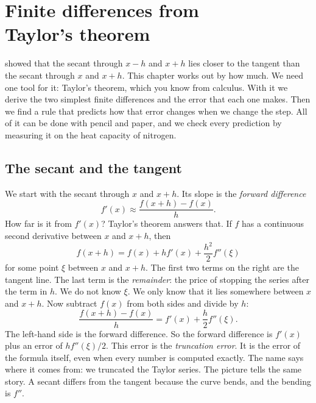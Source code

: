 \chapter[Finite differences from Taylor's theorem]{Finite differences from\\ Taylor's theorem}\label{ch:taylor}

 showed that the secant through $x - h$ and $x + h$ lies closer to the tangent than the secant
through $x$ and $x + h$. This chapter works out by how much. We need one tool for it: Taylor's theorem, which you
know from calculus. With it we derive the two simplest finite differences and the error that each one makes. Then we
find a rule that predicts how that error changes when we change the step. All of it can be done with pencil and
paper, and we check every prediction by measuring it on the heat capacity of nitrogen.

\section{The secant and the tangent}\label{sec:taylor-secant}

We start with the secant through $x$ and $x + h$. Its slope is the \emph{forward difference}
\begin{equation}
  f'(x) \approx \frac{f(x + h) - f(x)}{h}.
  \label{eq:forward}
\end{equation}
How far is it from $f'(x)$? Taylor's theorem answers that. If $f$ has a continuous second derivative between $x$
and $x + h$, then
\begin{equation*}
  f(x + h) = f(x) + h f'(x) + \frac{h^2}{2} f''(\xi)
\end{equation*}
for some point $\xi$ between $x$ and $x + h$.\cite{burden2016} The first two terms on the right are the tangent line.
The last term is the \emph{remainder}: the price of stopping the series after the term in $h$. We do not know $\xi$.
We only know that it lies somewhere between $x$ and $x + h$. Now subtract $f(x)$ from both sides and divide by $h$:
\begin{equation}
  \frac{f(x + h) - f(x)}{h} = f'(x) + \frac{h}{2} f''(\xi).
  \label{eq:forward-error}
\end{equation}
The left-hand side is the forward difference. So the forward difference is $f'(x)$ plus an error of
$h f''(\xi) / 2$. This error is the \emph{truncation error}. It is the error of the formula itself, even when every
number is computed exactly. The name says where it comes from: we truncated the Taylor series. The picture tells the
same story. A secant differs from the tangent because the curve bends, and the bending is $f''$.

